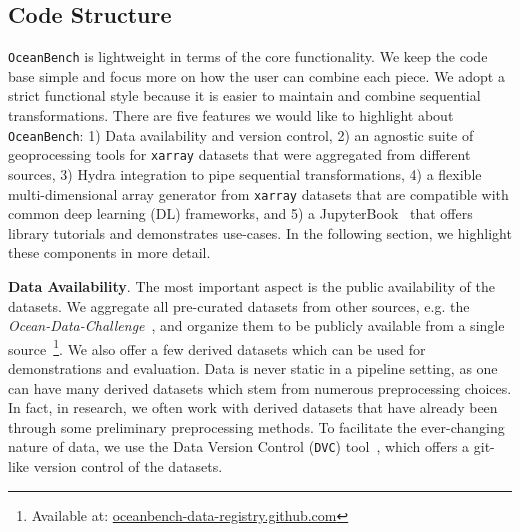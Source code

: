 \subsection{Code Structure} \label{sec:code_structure}

\texttt{OceanBench} is lightweight in terms of the core functionality.
We keep the code base simple and focus more on how the user can combine each piece.
We adopt a strict functional style because it is easier to maintain and combine sequential transformations. 
There are five features we would like to highlight about \texttt{OceanBench}: 1) Data availability and version control, 2) an agnostic suite of geoprocessing tools for \texttt{xarray} datasets that were aggregated from different sources,  3) Hydra integration to pipe sequential transformations, 4) a flexible multi-dimensional array generator from \texttt{xarray} datasets that are compatible with common deep learning (DL) frameworks, and 5) a JupyterBook~\cite{JupyterBook} that offers library tutorials and demonstrates use-cases.
In the following section, we highlight these components in more detail.

\textbf{Data Availability}. 
The most important aspect is the public availability of the datasets. 
We aggregate all pre-curated datasets from other sources, e.g. the \textit{Ocean-Data-Challenge}~\cite{DCOSEGULFSSH,DCOSSEGULFSSH}, and organize them to be publicly available from a single source~\footnote{Available at: \href{https://github.com/quentinf00/oceanbench-data-registry}{oceanbench-data-registry.github.com}}. 
We also offer a few derived datasets which can be used for demonstrations and evaluation. 
Data is never static in a pipeline setting, as one can have many derived datasets which stem from numerous preprocessing choices. 
In fact, in research, we often work with derived datasets that have already been through some preliminary preprocessing methods. 
To facilitate the ever-changing nature of data, we use the Data Version Control (\texttt{DVC}) tool~\cite{DVC}, which offers a git-like version control of the datasets.

